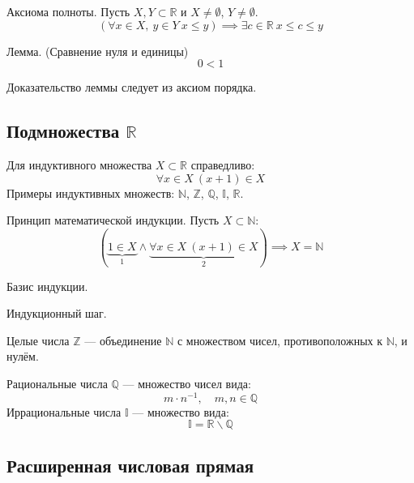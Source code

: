 \begin{theorem}
{\bold Аксиома полноты.} Пусть $X,Y\subset\mathbb{R}$ и $X\neq\emptyset$, $Y\neq\emptyset$. 
$$(\forall x\in X,\ y\in Y\ x\leq y)\implies\exists c\in\mathbb{R}\ x\leq c\leq y$$
\end{theorem}

\begin{theorem}
{\bold Лемма.} {\ital\color{desc}(Сравнение нуля и единицы)}
$$0\less 1$$
\end{theorem}

Доказательство леммы следует из {\ital аксиом порядка}.

\subsection{Подмножества $\mathbb{R}$}

Для {\bold индуктивного} множества $X\subset\mathbb{R}$ справедливо:
$$\forall x\in X\ (x+1)\in X$$
Примеры индуктивных множеств: $\mathbb{N}$, $\mathbb{Z}$, $\mathbb{Q}$, $\mathbb{I}$, $\mathbb{R}$.

\begin{theorem}
{\bold Принцип математической индукции.} Пусть $X\subset\mathbb{N}$:
$$(\underbrace{1\in X}_{1}\land\underbrace{\forall x\in X\ (x+1)\in X}_{2})\implies X=\mathbb{N}$$
\begin{list*}[][\#]
\item Базис индукции.
\item Индукционный шаг.
\end{list*}
\end{theorem}
{\bold Целые числа} $\mathbb{Z}$ --- объединение $\mathbb{N}$ с множеством чисел, противоположных к $\mathbb{N}$, и нулём.

{\bold Рациональные числа} $\mathbb{Q}$ --- множество чисел вида:
$$m\cdot n^{-1},\quad m,n\in\mathbb{Q}$$
{\bold Иррациональные числа} $\mathbb{I}$ --- множество вида:
$$\mathbb{I}=\mathbb{R}\backslash\mathbb{Q}$$

\subsection{Расширенная числовая прямая}

